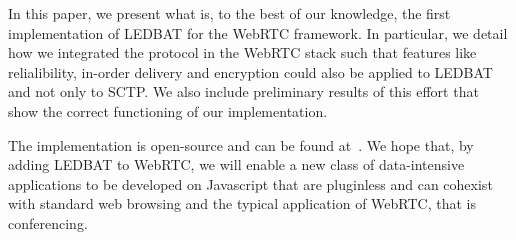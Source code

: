 \documentclass{sig-alternate}
\begin{document}
In this paper, we present what is, to the best of our knowledge, the first implementation
of LEDBAT for the WebRTC framework. In particular, we detail how we integrated the
protocol in the WebRTC stack such that features like relialibility, in-order delivery and
encryption could also be applied to LEDBAT and not only to SCTP. We also include
preliminary results of this effort that show the correct functioning of our
implementation.

The implementation is open-source and can be found at~\cite{}. We hope that, by adding
LEDBAT to WebRTC, we will enable a new class of data-intensive applications to be
developed on Javascript that are pluginless and can cohexist with standard web browsing
and the typical application of WebRTC, that is conferencing.





\end{document}
